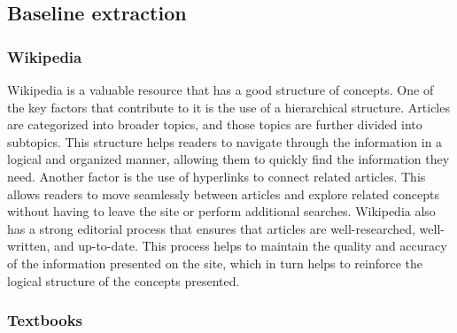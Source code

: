 \documentclass{article}
\begin{document}

\subsection{Baseline extraction}
\subsubsection{Wikipedia}

Wikipedia is a valuable resource that has a good structure of concepts. One of the key factors that contribute to it is the use of a hierarchical structure. Articles are categorized into broader topics, and those topics are further divided into subtopics. This structure helps readers to navigate through the information in a logical and organized manner, allowing them to quickly find the information they need. Another factor is the use of hyperlinks to connect related articles. This allows readers to move seamlessly between articles and explore related concepts without having to leave the site or perform additional searches. Wikipedia also has a strong editorial process that ensures that articles are well-researched, well-written, and up-to-date. This process helps to maintain the quality and accuracy of the information presented on the site, which in turn helps to reinforce the logical structure of the concepts presented.


\subsubsection{Textbooks}
\end{document}
